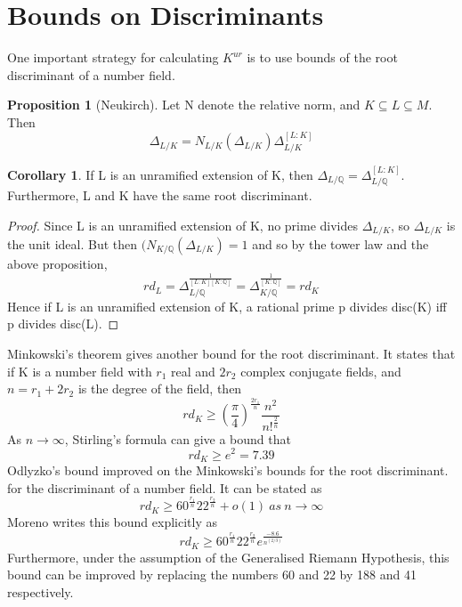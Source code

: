 \documentclass[12pt]{extarticle}
\newcommand{\<}{\langle}
\renewcommand{\>}{\rangle}
\theoremstyle{definition}
\newtheorem{corollary}{Corollary}
\newtheorem{proposition}{Proposition}
\begin{document}
\section{Bounds on Discriminants}
One important strategy for calculating $K^{ur}$ is to use bounds of the root discriminant of a number field. 
\begin{proposition}[Neukirch]
Let N denote the relative norm, and $K\subseteq L \subseteq M $. Then \begin{equation}
    \Delta_{L/K} = N_{L/K}(\Delta_{L/K})\Delta_{L/K}^{[L:K]}
\end{equation}
\end{proposition}
\begin{corollary}
 If L is an unramified extension of K, then $\Delta_{L/\mathbb{Q}}= \Delta_{L/\mathbb{Q}}^{[L:K]}$. Furthermore, L and K have the same root discriminant.
\end{corollary}
\begin{proof}
Since L is an unramified extension of K, no prime divides $\Delta_{L/K}$, so $\Delta_{L/K}$ is the unit ideal. But then $(N_{K/\mathbb{Q}}(\Delta_{L/K})=1$ and so by the tower law and the above proposition, \begin{equation}
    rd_L=\Delta_{L/\mathbb{Q}}^\frac{1}{[L:K][K:\mathbb{Q}]}=\Delta_{K/\mathbb{Q}}^\frac{1}{[K:\mathbb{Q}]}= rd_K
\end{equation}
Hence if L is an unramified extension of K, a rational prime p divides disc(K) iff p divides disc(L).
\end{proof}
Minkowski's theorem gives another bound for the root discriminant. It states that if K is a number field with $r_1$ real and $2r_2$ complex conjugate fields, and $n=r_1+2r_2$ is the degree of the field, then 
\begin{equation}
rd_K\geqslant (\frac{\pi}{4})^{\frac{2r_1}{n}}\frac{n^2}{n!^{\frac{2}{n}}}
\end{equation} 
As $n\rightarrow \infty$, Stirling's formula can give a bound that
\begin{equation}
    rd_K\geqslant e^2 = 7.39
\end{equation}
Odlyzko's bound \cite{ODL1990} improved on the Minkowski's bounds for the root discriminant. for the discriminant of a number field. It can be stated as  
\begin{equation}
rd_K\geqslant 60^{\frac{r_1}{n}}22^{\frac{r_2}{n}}+o(1)\:as\:n\rightarrow \infty   
\end{equation}
Moreno writes this bound explicitly as 
\begin{equation}
rd_K\geqslant 60^{\frac{r_1}{n}}22^{\frac{r_2}{n}}e^\frac{-8.6}{n^(2/3)}
\end{equation}
Furthermore, under the assumption of the Generalised Riemann Hypothesis, 
this bound can be improved by replacing the numbers 60 and 22 by 188 and 41 respectively. 
\end{document}
